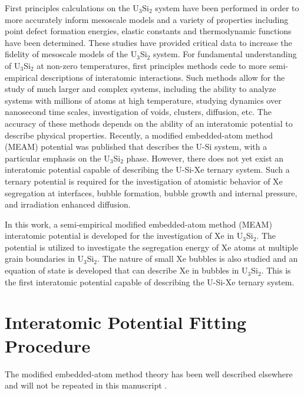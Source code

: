 \documentclass[review]{elsarticle}
\begin{document}
First principles calculations on the U$_3$Si$_2$ system have been performed in order to more accurately inform mesoscale models \cite{noordhoek2016, middleburgh2016, andersson2018, chattaraj2018, wang2016} and a variety of properties including point defect formation energies, elastic constants and thermodynamic functions have been determined. These studies have provided critical data to increase the fidelity of mesoscale models of the U$_3$Si$_2$ system. For fundamental understanding of U$_3$Si$_2$ at non-zero temperatures, first principles methods cede to more semi-empirical descriptions of interatomic interactions. Such methods allow for the study of much larger and complex systems, including the ability to analyze systems with millions of atoms at high temperature, studying dynamics over nanosecond time scales, investigation of voids, clusters, diffusion, etc. The accuracy of these methods depends on the ability of an interatomic potential to describe physical properties. Recently, a modified embedded-atom method (MEAM) potential was published \cite{beelerusi} that describes the U-Si system, with a particular emphasis on the U$_3$Si$_2$ phase. However, there does not yet exist an interatomic potential capable of describing the U-Si-Xe ternary system. Such a ternary potential is required for the investigation of atomistic behavior of Xe segregation at interfaces, bubble formation, bubble growth and internal pressure, and irradiation enhanced diffusion. 

In this work, a semi-empirical modified embedded-atom method (MEAM) interatomic potential is developed for the investigation of Xe in U$_3$Si$_2$. The potential is utilized to investigate the segregation energy of Xe atoms at multiple grain boundaries in U$_3$Si$_2$. The nature of small Xe bubbles is also studied and an equation of state is developed that can describe Xe in bubbles in U$_3$Si$_2$. This is the first interatomic potential capable of describing the U-Si-Xe ternary system.
 
\section{Interatomic Potential Fitting Procedure}
The modified embedded-atom method theory has been well described elsewhere and will not be repeated in this manuscript \cite{baskes1997, baskes2000, baskes2014, baskes1989, valone2006, liu1999, lee2000, lee2001, lee2003}. 
\end{document}
